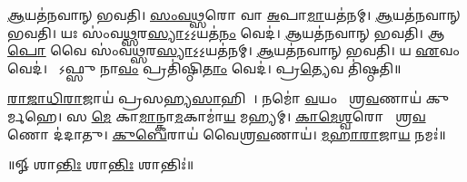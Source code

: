 \ul{𑌆}𑌯𑌤॑𑌨𑌵𑌾𑌨𑍍‌ 𑌭𑌵𑌤𑌿। \ul{𑌸𑌂}\ul{𑌵}\ul{𑌥𑍍𑌸}𑌰𑍋 𑌵𑌾 \ul{𑌅}𑌪𑌾\ul{𑌮𑌾}𑌯𑌤॑𑌨𑌮𑍍। 
\ul{𑌆}𑌯𑌤॑𑌨𑌵𑌾𑌨𑍍‌ 𑌭𑌵𑌤𑌿। 𑌯𑌃 𑌸𑌂॑𑌵\ul{𑌥𑍍𑌸}𑌰\ul{𑌸𑍍𑌯𑌾}𑌽॒𑌽॒𑌯𑌤॑\ul{𑌨𑌂} 𑌵𑍇𑌦॑। 
\ul{𑌆}𑌯𑌤॑𑌨𑌵𑌾𑌨𑍍‌ 𑌭𑌵𑌤𑌿। 𑌆\ul{𑌪𑍋} 𑌵𑍈 𑌸𑌂॑𑌵\ul{𑌥𑍍𑌸}𑌰\ul{𑌸𑍍𑌯𑌾}𑌽॒𑌽॒𑌯𑌤॑𑌨𑌮𑍍‌। 
\ul{𑌆}𑌯𑌤॑𑌨𑌵𑌾𑌨𑍍‌ 𑌭𑌵𑌤𑌿। 𑌯 \ul{𑌏}𑌵𑌂 𑌵𑍇𑌦॑। 
𑌯𑍋᳚𑌽𑌫𑍍𑌸𑍁 𑌨𑌾\ul{𑌵𑌂} 𑌪𑍍𑌰𑌤𑌿॑𑌷𑍍𑌠𑌿\ul{𑌤𑌾𑌂} 𑌵𑍇𑌦॑। 𑌪𑍍𑌰\ul{𑌤𑍍𑌯𑍇}𑌵 𑌤𑌿॑𑌷𑍍𑌠𑌤𑌿॥

\ul{𑌰𑌾}\ul{𑌜𑌾}\ul{𑌧𑌿}\ul{𑌰𑌾}𑌜𑌾𑌯॑ 𑌪𑍍𑌰𑌸𑌹𑍍𑌯\ul{𑌸𑌾}𑌹𑌿𑌨𑍇᳚। 
𑌨𑌮𑍋॑ \ul{𑌵}𑌯𑌂 𑌵𑍈᳚𑌶𑍍𑌰\ul{𑌵}𑌣𑌾𑌯॑ 𑌕𑍁𑌰𑍍𑌮𑌹𑍇। 𑌸 \ul{𑌮𑍇} 𑌕𑌾\ul{𑌮𑌾}𑌨𑍍𑌕𑌾\ul{𑌮}𑌕𑌾𑌮𑌾॑\ul{𑌯} 𑌮𑌹𑍍𑌯𑌮𑍍‌᳚। 
\ul{𑌕𑌾}\ul{𑌮𑍇}\ul{𑌶𑍍𑌵}𑌰𑍋 𑌵𑍈᳚𑌶𑍍𑌰\ul{𑌵}𑌣𑍋 𑌦॑𑌦𑌾𑌤𑍁। \ul{𑌕𑍁}\ul{𑌬𑍇}𑌰𑌾𑌯॑ 𑌵𑍈𑌶𑍍𑌰\ul{𑌵}𑌣𑌾𑌯॑। 
\ul{𑌮}\ul{𑌹𑌾}\ul{𑌰𑌾}𑌜𑌾\ul{𑌯} 𑌨𑌮𑌃॑॥
\centerline{॥𑍐 𑌶𑌾\ul{𑌨𑍍𑌤𑌿𑌃} 𑌶𑌾\ul{𑌨𑍍𑌤𑌿𑌃} 𑌶𑌾𑌨𑍍𑌤𑌿𑌃॑॥}
